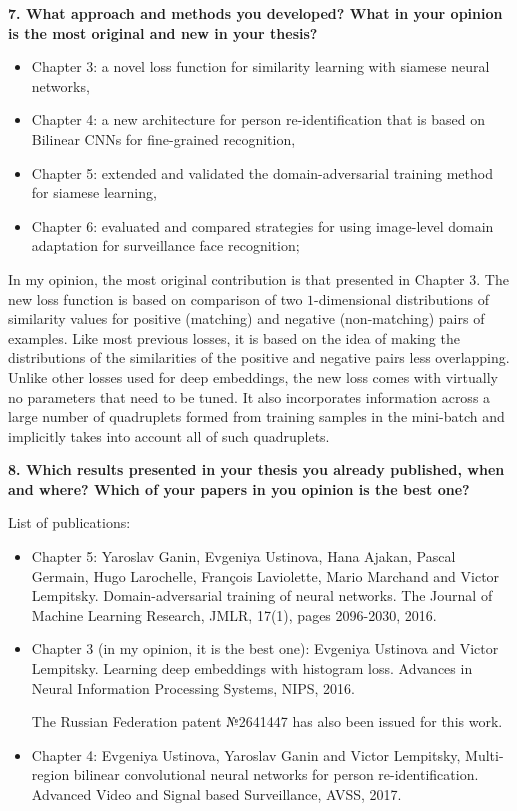\documentclass[a4paper, 11pt, oneside]{Thesis}  %
\begin{document}
\bigskip\ident\textbf{7. What approach and methods you developed?
What in your opinion is the most original and new in your thesis?}

\begin{itemize}
    \item Chapter 3: a novel loss function for similarity learning with siamese neural networks,
    \item  Chapter 4:
    a new architecture for person re-identification that is based on Bilinear CNNs for fine-grained recognition,
    \item Chapter 5:
    extended and validated the domain-adversarial training method for siamese learning,
    \item Chapter 6:
    evaluated and compared strategies for using image-level domain adaptation for surveillance face recognition;
\end{itemize}

In my opinion, the most original contribution is that presented in Chapter 3. The new loss function is based on comparison of two $1$-dimensional distributions of similarity values for positive (matching) and negative (non-matching) pairs of examples. Like most previous losses, it is based on the idea of making the distributions of the similarities of the positive and negative pairs less overlapping. Unlike other losses used for deep embeddings, the new loss comes with virtually no parameters that need to be tuned. It also incorporates information across a large number of quadruplets formed from training samples in the mini-batch and implicitly takes into account all of such quadruplets.



\bigskip\ident\textbf{8. Which results presented in your thesis you already published, when and where?
Which of your papers in you opinion is the best one?
}

{\large
 List of publications:}



\begin{itemize}
    \item Chapter 5:
Yaroslav Ganin, Evgeniya Ustinova, Hana Ajakan, Pascal Germain, Hugo Larochelle, Fran\c{c}ois Laviolette, Mario Marchand and Victor Lempitsky. Domain-adversarial training of neural networks. The Journal of Machine Learning Research, JMLR, 17(1), pages 2096-2030, 2016.
    
    \item Chapter 3 (in my opinion, it is the best one):
Evgeniya Ustinova and Victor Lempitsky. Learning deep embeddings with histogram loss. Advances in Neural Information Processing Systems, NIPS, 2016.

    The Russian Federation patent №2641447 has also been issued for this work.
    
    \item Chapter 4:
    Evgeniya Ustinova, Yaroslav Ganin and Victor Lempitsky,  Multi-region bilinear convolutional neural networks for person re-identification. Advanced Video and Signal based Surveillance, AVSS, 2017.
    
\end{itemize}
\end{document}
